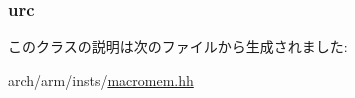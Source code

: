 \label{classArmISA_1_1MicroIntRegOp_a3771d4e6da84a09dbf436d6b1af2be46}
\hypertarget{classArmISA_1_1MicroIntRegOp_a7b2bf3346575e8b24bdd921acf571967}{
\subsubsection[{urc}]{ {\bf urc}}}
\label{classArmISA_1_1MicroIntRegOp_a7b2bf3346575e8b24bdd921acf571967}


このクラスの説明は次のファイルから生成されました:\begin{DoxyCompactItemize}
\item 
arch/arm/insts/\hyperlink{macromem_8hh}{macromem.hh}\end{DoxyCompactItemize}
